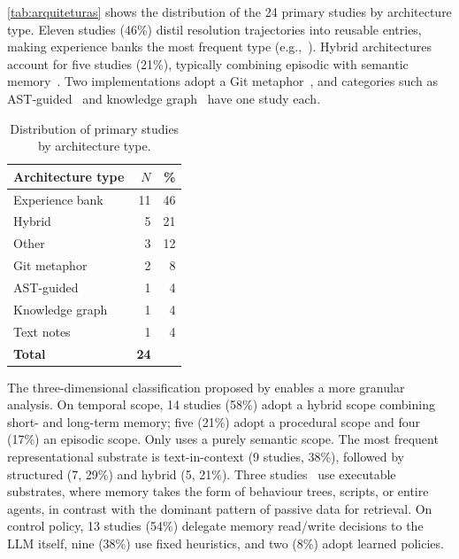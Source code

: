 \autoref{tab:arquiteturas} shows the distribution of the 24 primary
studies by architecture type.
Eleven studies (46\%) distil resolution trajectories into reusable
entries, making experience banks the most frequent type
(e.g.,~\citep{chen2025sweexp,deng2026memcoder,guo2026eet,shen2026structurally,su2025learnbyinteract}).
Hybrid architectures account for five studies (21\%), typically
combining episodic with semantic
memory~\citep{hosain2025xolver,nadafian2026kapso,wong2025confucius}.
Two implementations adopt a Git
metaphor~\citep{wang2026improving,wu2025gcc}, and categories such as
AST-guided~\citep{wang2026codemem} and knowledge
graph~\citep{dong2026kernelblaster} have one study each.

\begin{table}[htbp]
  \centering
  \caption{Distribution of primary studies by architecture type.}
  \label{tab:arquiteturas}
  \begin{tabular}{l r r}
    \toprule
    Architecture type & $N$ & \% \\
    \midrule
    Experience bank     & 11 & 46 \\
    Hybrid              &  5 & 21 \\
    Other               &  3 & 12 \\
    Git metaphor        &  2 &  8 \\
    AST-guided          &  1 &  4 \\
    Knowledge graph     &  1 &  4 \\
    Text notes          &  1 &  4 \\
    \midrule
    \textbf{Total}      & \textbf{24} & \\
    \bottomrule
  \end{tabular}
\end{table}

The three-dimensional classification proposed by
\citet{du2026memory} enables a more granular analysis.
On temporal scope, 14 studies (58\%) adopt a hybrid scope combining
short- and long-term memory; five (21\%) adopt a procedural scope and
four (17\%) an episodic scope.
Only \citet{wang2026memgovern} uses a purely semantic scope.
The most frequent representational substrate is text-in-context (9
studies, 38\%), followed by structured (7, 29\%) and hybrid (5, 21\%).
Three
studies~\citep{li2026traversalaspolicy,xia2025livesweagent,zhang2025darwingodel}
use executable substrates, where memory takes the form of behaviour
trees, scripts, or entire agents, in contrast with the dominant pattern
of passive data for retrieval.
On control policy, 13 studies (54\%) delegate memory read/write
decisions to the LLM itself, nine (38\%) use fixed heuristics, and two
(8\%) adopt learned policies.

